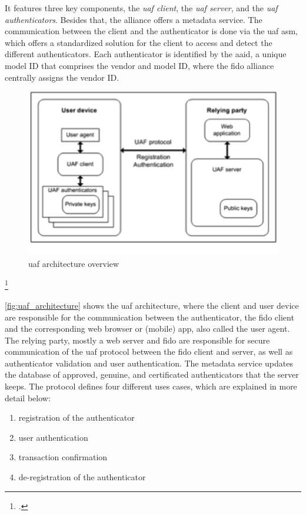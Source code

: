 It features three key components, the \textit{\gls{uaf} client}, the \textit{\gls{uaf} server}, and the \textit{\gls{uaf} authenticators}. Besides that, the alliance offers a metadata service. The communication between the client and the authenticator is done via the \gls{uaf} \gls{asm}, which offers a standardized solution for the client to access and detect the different authenticators. Each authenticator is identified by the \gls{aaid}, a unique model ID that comprises the vendor and model ID, where the \gls{fido} alliance centrally assigns the vendor ID.

\begin{figure}[hbt]
	\centering
	\includegraphics[width=\textwidth]{pics/Picture1}
	\caption[\gls{uaf} architecture overview]{\gls{uaf} architecture overview\footnotemark}
	\label{fig:uaf_architecture}
\end{figure}
\footcitetext[Source: diagram by author, based on][4]{uaf-overview}

\autoref{fig:uaf_architecture} shows the \gls{uaf} architecture, where the client and user device are responsible for the communication between the authenticator, the \gls{fido} client and the corresponding web browser or (mobile) app, also called the user agent. The relying party, mostly a web server and \gls{fido} are responsible for secure communication of the \gls{uaf} protocol between the \gls{fido} client and server, as well as authenticator validation and user authentication. The metadata service updates the database of approved, genuine, and certificated authenticators that the server keeps. The protocol defines four different uses cases, which are explained in more detail below:

\begin{enumerate}
	\item registration of the authenticator
	\item user authentication
	\item transaction confirmation
	\item de-registration of the authenticator
\end{enumerate}


